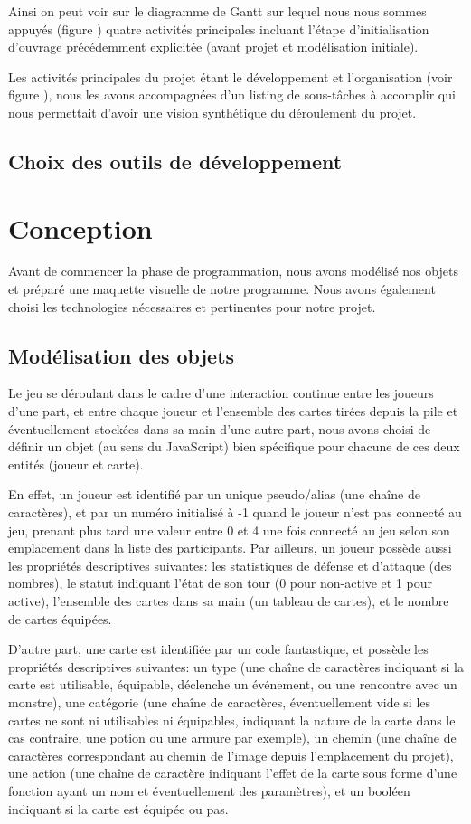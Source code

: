 \documentclass[12pt]{report}
\begin{document}
		Ainsi  on peut voir sur le diagramme de Gantt sur lequel nous nous sommes appuyés (figure ) quatre activités principales incluant l’étape d’initialisation d’ouvrage précédemment explicitée (avant projet et modélisation initiale).

		Les activités principales du projet étant le développement et l'organisation (voir figure  ), nous les avons accompagnées d’un listing de sous-tâches à accomplir qui nous permettait d’avoir une vision synthétique du déroulement du projet.
\newpage


    \section{Choix des outils de développement}

\chapter{Conception}

	Avant de commencer la phase de programmation, nous avons modélisé nos objets et préparé une maquette visuelle de notre programme. Nous avons également choisi les technologies nécessaires et pertinentes pour notre projet.

    \section{Modélisation des objets}
		Le jeu se déroulant dans le cadre d'une interaction continue entre les joueurs d'une part, et entre chaque joueur et l'ensemble des cartes tirées depuis la pile et éventuellement stockées dans sa main d'une autre part, nous avons choisi de définir un objet (au sens du JavaScript) bien spécifique pour chacune de ces deux entités (joueur et carte).

		En effet, un joueur est identifié par un unique pseudo/alias (une chaîne de caractères), et par un numéro initialisé à -1 quand le joueur n'est pas connecté au jeu, prenant plus tard une valeur entre 0 et 4 une fois connecté au jeu selon son emplacement dans la liste des participants. Par ailleurs, un joueur possède aussi les propriétés descriptives suivantes: les statistiques de défense et d'attaque (des nombres), le statut indiquant l'état de son tour (0 pour non-active et 1 pour active), l'ensemble des cartes dans sa main (un tableau de cartes), et le nombre de cartes équipées.

		D'autre part, une carte est identifiée par un code fantastique, et possède les propriétés descriptives suivantes: un type (une chaîne de caractères indiquant si la carte est utilisable, équipable, déclenche un événement, ou une rencontre avec un monstre), une catégorie (une chaîne de caractères, éventuellement vide si les cartes ne sont ni utilisables ni équipables, indiquant la nature de la carte dans le cas contraire, une potion ou une armure par exemple), un chemin (une chaîne de caractères correspondant au chemin de l'image depuis l'emplacement du projet), une action (une chaîne de caractère indiquant l'effet de la carte sous forme d'une fonction ayant un nom et éventuellement des paramètres), et un booléen indiquant si la carte est équipée ou pas.
\end{document}

